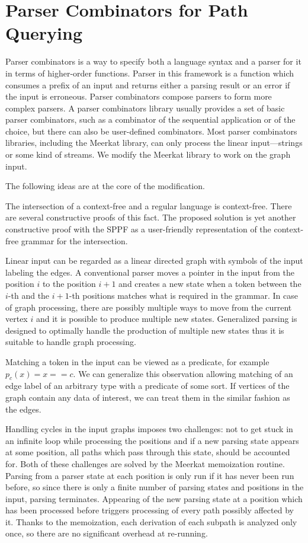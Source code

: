 \section{Parser Combinators for Path Querying}
\label{sec:combinators}

Parser combinators is a way to specify both a language syntax and a parser for it in terms of higher-order functions.
Parser in this framework is a function which consumes a prefix of an input and returns either a parsing result or an error if the input is erroneous.
Parser combinators compose parsers to form more complex parsers.
A parser combinators library usually provides a set of basic parser combinators, such as a combinator of the sequential application or of the choice, but there can also be user-defined combinators.
Most parser combinators libraries, including the Meerkat library, can only process the linear input---strings or some kind of streams.
We modify the Meerkat library to work on the graph input.

The following ideas are at the core of the modification.

The intersection of a context-free and a regular language is context-free. There are several constructive proofs of this fact.
The proposed solution is yet another constructive proof with the SPPF as a user-friendly representation of the context-free grammar for the intersection.

Linear input can be regarded as a linear directed graph with symbols of the input labeling the edges.
A conventional parser moves a pointer in the input from the position $i$ to the position $i+1$ and creates a new state when a token between the $i$-th and the $i+1$-th positions matches what is required in the grammar.
In case of graph processing, there are possibly multiple ways to move from the current vertex $i$ and it is possible to produce multiple new states.
Generalized parsing is designed to optimally handle the production of multiple new states thus it is suitable to handle graph processing.

Matching a token in the input can be viewed as a predicate, for example $p_c (x) = x == c$.
We can generalize this observation allowing matching of an edge label of an arbitrary type with a predicate of some sort.
If vertices of the graph contain any data of interest, we can treat them in the similar fashion as the edges.

Handling cycles in the input graphs imposes two challenges: not to get stuck in an infinite loop while processing the positions and if a new parsing state appears at some position, all paths which pass through this state, should be accounted for.
Both of these challenges are solved by the Meerkat memoization routine.
Parsing from a parser state at each position is only run if it has never been run before, so since there is only a finite number of parsing states and positions in the input, parsing terminates.
Appearing of the new parsing state at a position which has been processed before triggers processing of every path possibly affected by it.
Thanks to the memoization, each derivation of each subpath is analyzed only once, so there are no significant overhead at re-running.


